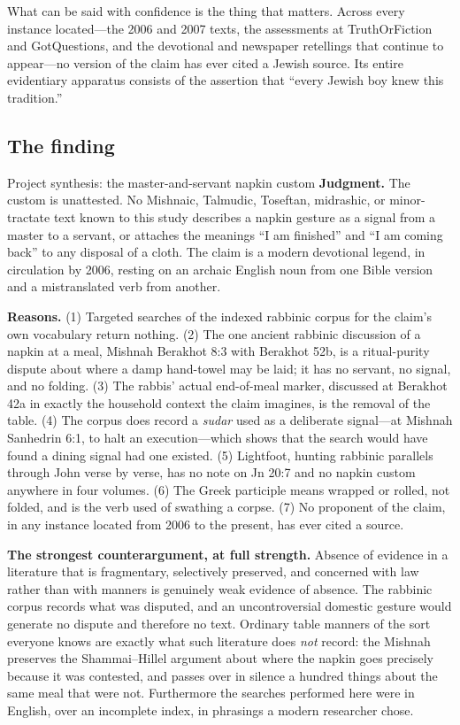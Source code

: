 What can be said with confidence is the thing that matters. Across every
instance located---the 2006 and 2007 texts, the assessments at TruthOrFiction
and GotQuestions, and the devotional and newspaper retellings that continue to
appear---no version of the claim has ever cited a Jewish source. Its entire
evidentiary apparatus consists of the assertion that ``every Jewish boy knew
this tradition.''

\subsection{The finding}

\begin{studybox}{Project synthesis: the master-and-servant napkin custom}
\textbf{Judgment.} The custom is unattested. No Mishnaic, Talmudic, Toseftan,
midrashic, or minor-tractate text known to this study describes a napkin
gesture as a signal from a master to a servant, or attaches the meanings ``I am
finished'' and ``I am coming back'' to any disposal of a cloth. The claim is a
modern devotional legend, in circulation by 2006, resting on an archaic English
noun from one Bible version and a mistranslated verb from another.

\textbf{Reasons.} (1) Targeted searches of the indexed rabbinic corpus for the
claim's own vocabulary return nothing. (2) The one ancient rabbinic discussion
of a napkin at a meal, Mishnah Berakhot 8:3 with Berakhot 52b, is a
ritual-purity dispute about where a damp hand-towel may be laid; it has no
servant, no signal, and no folding. (3) The rabbis' actual end-of-meal marker,
discussed at Berakhot 42a in exactly the household context the claim imagines,
is the removal of the table. (4) The corpus does record a \emph{sudar} used as
a deliberate signal---at Mishnah Sanhedrin 6:1, to halt an execution---which
shows that the search would have found a dining signal had one existed. (5)
Lightfoot, hunting rabbinic parallels through John verse by verse, has no note
on Jn 20:7 and no napkin custom anywhere in four volumes. (6) The Greek
participle means wrapped or rolled, not folded, and is the verb used of
swathing a corpse. (7) No proponent of the claim, in any instance located from
2006 to the present, has ever cited a source.

\textbf{The strongest counterargument, at full strength.} Absence of evidence in
a literature that is fragmentary, selectively preserved, and concerned with law
rather than with manners is genuinely weak evidence of absence. The rabbinic
corpus records what was disputed, and an uncontroversial domestic gesture would
generate no dispute and therefore no text. Ordinary table manners of the sort
everyone knows are exactly what such literature does \emph{not} record: the
Mishnah preserves the Shammai--Hillel argument about where the napkin goes
precisely because it was contested, and passes over in silence a hundred things
about the same meal that were not. Furthermore the searches performed here were
in English, over an incomplete index, in phrasings a modern researcher chose.


\end{studybox}
